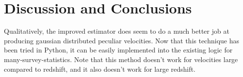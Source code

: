 \documentclass[usenatbib]{mn2e}
\begin{document}
\section{Discussion and Conclusions}

Qualitatively, the improved estimator does seem to do a much better job at producing gaussian distributed peculiar velocities. Now that this technique has been tried in Python, it can be easily implemented into the existing logic for many-survey-statistics. Note that this method doesn't work for velocities large compared to redshift, and it also doesn't work for large redshift.


\end{document}
